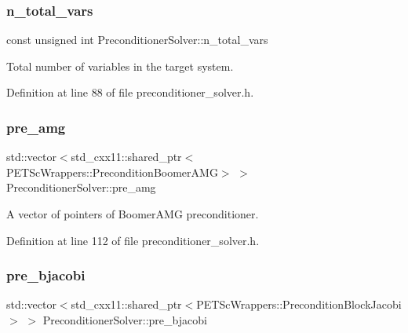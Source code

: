 \subsubsection{\texorpdfstring{n\+\_\+total\+\_\+vars}{n\_total\_vars}}
{\footnotesize\ttfamily const unsigned int Preconditioner\+Solver\+::n\+\_\+total\+\_\+vars\hspace{0.3cm}{\ttfamily [private]}}



Total number of variables in the target system. 



Definition at line 88 of file preconditioner\+\_\+solver.\+h.

\mbox{\label{class_preconditioner_solver_a235b12fcd8e5978c1a3df8c76d05808b}} 
\subsubsection{\texorpdfstring{pre\+\_\+amg}{pre\_amg}}
{\footnotesize\ttfamily std\+::vector$<$std\+\_\+cxx11\+::shared\+\_\+ptr$<$P\+E\+T\+Sc\+Wrappers\+::\+Precondition\+Boomer\+A\+MG$>$ $>$ Preconditioner\+Solver\+::pre\+\_\+amg\hspace{0.3cm}{\ttfamily [private]}}



A vector of pointers of Boomer\+A\+MG preconditioner. 



Definition at line 112 of file preconditioner\+\_\+solver.\+h.

\mbox{\label{class_preconditioner_solver_af3d0217e39b9527c67ac6ce56464f11a}} 
\subsubsection{\texorpdfstring{pre\+\_\+bjacobi}{pre\_bjacobi}}
{\footnotesize\ttfamily std\+::vector$<$std\+\_\+cxx11\+::shared\+\_\+ptr$<$P\+E\+T\+Sc\+Wrappers\+::\+Precondition\+Block\+Jacobi$>$ $>$ Preconditioner\+Solver\+::pre\+\_\+bjacobi\hspace{0.3cm}{\ttfamily [private]}}



